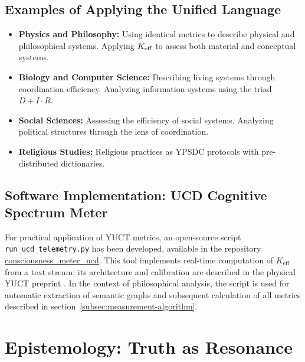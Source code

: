\documentclass[12pt,a4paper]{article}
\begin{document}
	\subsection{Examples of Applying the Unified Language}
	
	\begin{itemize}
		\item \textbf{Physics and Philosophy:} Using identical metrics to describe physical and philosophical systems. Applying \(\Keff\) to assess both material and conceptual systems.
		\item \textbf{Biology and Computer Science:} Describing living systems through coordination efficiency. Analyzing information systems using the triad \(D + I \cdot R\).
		\item \textbf{Social Sciences:} Assessing the efficiency of social systems. Analyzing political structures through the lens of coordination.
		\item \textbf{Religious Studies:} Religious practices as YPSDC protocols with pre-distributed dictionaries.
	\end{itemize}
	
	\subsection{Software Implementation: UCD Cognitive Spectrum Meter}
	\label{subsec:ucd-software}
	
	For practical application of YUCT metrics, an open-source script \texttt{run\_ucd\_telemetry.py} has been developed, available in the repository \href{https://github.com/Alexey-Yakushev-YUCT/consciousness_meter_ucd}{consciousness\_meter\_ucd}. This tool implements real-time computation of \(K_{\mathrm{eff}}\) from a text stream; its architecture and calibration are described in the physical YUCT preprint \cite{Yakushev2026b}. In the context of philosophical analysis, the script is used for automatic extraction of semantic graphs and subsequent calculation of all metrics described in section~\ref{subsec:measurement-algorithm}.
	
	
	\section{Epistemology: Truth as Resonance}
	
\end{document}
